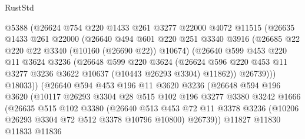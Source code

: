 \begin{lexlean}{RustStd}
\begin{coremodule}
                  @5388
                  (@26624
                    @754
                    @220
                    @1433
                    @261
                    @3277
                    @22000
                    @4072
                    @11515
                    (@26635
                      @1433
                      @261
                      @22000
                      (@26640
                        @494
                        @601
                        @220
                        @251
                        @3340
                        @3916
                        (@26685 @22 @220 @22 @3340 (@10160 (@26690 @22)) @10674)
                        (@26640
                          @599
                          @453
                          @220
                          @11
                          @3624
                          @3236
                          (@26648
                            @599
                            @220
                            @3624
                            (@26624
                              @596
                              @220
                              @453
                              @11
                              @3277
                              @3236
                              @3622
                              @10637
                              (@10443 @26293 @3304)
                              @11862))
                          @26739)))
                    @18033))
                (@26640
                  @594
                  @453
                  @196
                  @11
                  @3620
                  @3236
                  (@26648
                    @594
                    @196
                    @3620
                    (@10117
                      @26293
                      @3304
                      @28
                      @515
                      @102
                      @196
                      @3277
                      @3380
                      @3242
                      @1666
                      (@26635
                        @515
                        @102
                        @3380
                        (@26640
                          @513
                          @453
                          @72
                          @11
                          @3378
                          @3236
                          (@10206 @26293 @3304 @72 @512 @3378 @10796 @10800)
                          @26739))
                      @11827
                      @11830
                      @11833
                      @11836

\end{coremodule}
\end{lexlean}
